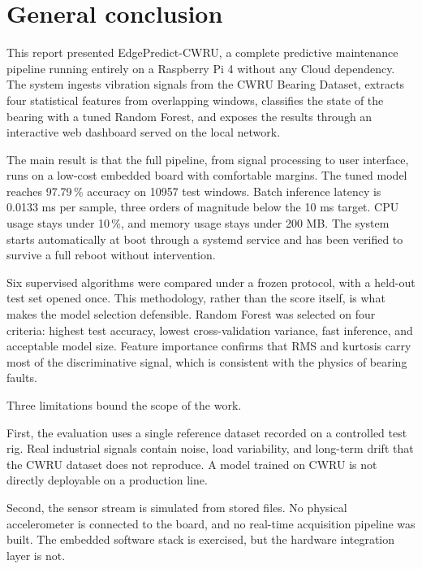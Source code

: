 \chapter*{General conclusion}

\noindent
This report presented EdgePredict-CWRU, a complete predictive maintenance pipeline running entirely on a Raspberry Pi 4 without any Cloud dependency. The system ingests vibration signals from the CWRU Bearing Dataset, extracts four statistical features from overlapping windows, classifies the state of the bearing with a tuned Random Forest, and exposes the results through an interactive web dashboard served on the local network.

The main result is that the full pipeline, from signal processing to user interface, runs on a low-cost embedded board with comfortable margins. The tuned model reaches 97.79\,\% accuracy on \num{10957} test windows. Batch inference latency is 0.0133 ms per sample, three orders of magnitude below the 10 ms target. CPU usage stays under 10\,\%, and memory usage stays under 200 MB. The system starts automatically at boot through a systemd service and has been verified to survive a full reboot without intervention.

Six supervised algorithms were compared under a frozen protocol, with a held-out test set opened once. This methodology, rather than the score itself, is what makes the model selection defensible. Random Forest was selected on four criteria: highest test accuracy, lowest cross-validation variance, fast inference, and acceptable model size. Feature importance confirms that RMS and kurtosis carry most of the discriminative signal, which is consistent with the physics of bearing faults.

Three limitations bound the scope of the work.

First, the evaluation uses a single reference dataset recorded on a controlled test rig. Real industrial signals contain noise, load variability, and long-term drift that the CWRU dataset does not reproduce. A model trained on CWRU is not directly deployable on a production line.

Second, the sensor stream is simulated from stored files. No physical accelerometer is connected to the board, and no real-time acquisition pipeline was built. The embedded software stack is exercised, but the hardware integration layer is not.

